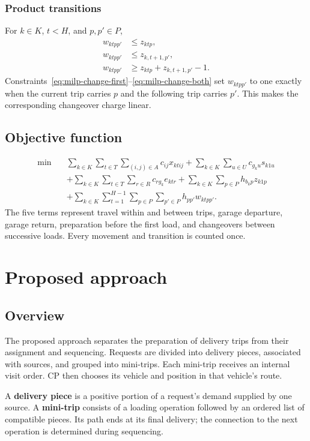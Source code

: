 \subsubsection{Product transitions}
For $k\in K$, $t<H$, and $p,p'\in P$,
\begin{align}
w_{ktpp'}&\leq z_{ktp},\label{eq:milp-change-first}\\
w_{ktpp'}&\leq z_{k,t+1,p'},\label{eq:milp-change-second}\\
w_{ktpp'}&\geq z_{ktp}+z_{k,t+1,p'}-1.\label{eq:milp-change-both}
\end{align}
Constraints~\eqref{eq:milp-change-first}--\eqref{eq:milp-change-both} set
$w_{ktpp'}$ to one exactly when the current trip carries $p$ and the following
trip carries $p'$. This makes the corresponding changeover charge linear.

\subsection{Objective function}
\begin{align}
\min\quad
&\sum_{k\in K}\sum_{t\in T}\sum_{(i,j)\in A}c_{ij}x_{ktij}
+\sum_{k\in K}\sum_{u\in U}c_{g_ku}s_{k1u}\nonumber\\
&+\sum_{k\in K}\sum_{t\in T}\sum_{r\in R}c_{rg_k}e_{ktr}
+\sum_{k\in K}\sum_{p\in P}h_{b_kp}z_{k1p}\nonumber\\
&+\sum_{k\in K}\sum_{t=1}^{H-1}\sum_{p\in P}\sum_{p'\in P}
 h_{pp'}w_{ktpp'}.
\label{eq:milp-objective}
\end{align}
The five terms represent travel within and between trips, garage departure,
garage return, preparation before the first load, and changeovers between
successive loads. Every movement and transition is counted once.

\section{Proposed approach}\label{sec:proposed-approach}
\subsection{Overview}
The proposed approach separates the preparation of delivery trips from their
assignment and sequencing. Requests are divided into delivery pieces, associated
with sources, and grouped into mini-trips. Each mini-trip receives an internal
visit order. CP then chooses its vehicle and position in that vehicle's route.

A \textbf{delivery piece} is a positive portion of a request's demand supplied
by one source. A \textbf{mini-trip} consists of a loading operation followed
by an ordered list of compatible pieces. Its path ends at its final delivery;
the connection to the next operation is determined during sequencing.

